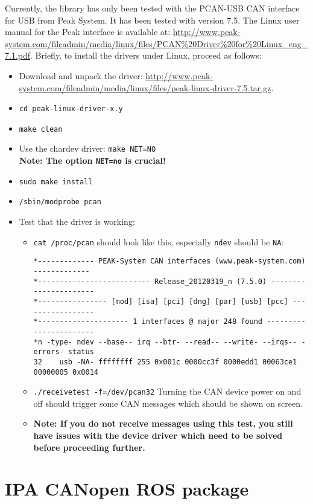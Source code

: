 Currently, the library has only been tested with the PCAN-USB CAN interface for USB from Peak System. It has been tested with version 7.5. The Linux user manual for the Peak interface is available at: \url{http://www.peak-system.com/fileadmin/media/linux/files/PCAN%20Driver%20for%20Linux_eng_7.1.pdf}. Briefly, to install the drivers under Linux, proceed as follows:
  \begin{itemize}
  \item Download and unpack the driver: \url{http://www.peak-system.com/fileadmin/media/linux/files/peak-linux-driver-7.5.tar.gz}.
  \item \texttt{cd peak-linux-driver-x.y}
  \item \texttt{make clean}
  \item Use the chardev driver: \texttt{make NET=NO}\\
    {\bf Note: The option \texttt{NET=no} is crucial!}
  \item \texttt{sudo make install}
  \item \texttt{/sbin/modprobe pcan}

  \item Test that the driver is working:
    \begin{itemize}
    \item \texttt{cat /proc/pcan} should look like this, especially \texttt{ndev} should be \texttt{NA}:
      {\scriptsize
\begin{verbatim}
*------------- PEAK-System CAN interfaces (www.peak-system.com) -------------
*-------------------------- Release_20120319_n (7.5.0) ----------------------
*---------------- [mod] [isa] [pci] [dng] [par] [usb] [pcc] -----------------
*--------------------- 1 interfaces @ major 248 found -----------------------
*n -type- ndev --base-- irq --btr- --read-- --write- --irqs-- -errors- status
32    usb -NA- ffffffff 255 0x001c 0000cc3f 0000edd1 00063ce1 00000005 0x0014
\end{verbatim}}
\item \texttt{./receivetest -f=/dev/pcan32} Turning the CAN device power on and off should trigger some CAN messages which should be shown on screen.
\item {\bf Note: If you do not receive messages using this test, you still have issues with the device driver which need to be solved before proceeding further.}
    \end{itemize}
  \end{itemize}

  \section{IPA CANopen ROS package}
\label{chap:installation:ipa_canopen_ros}

